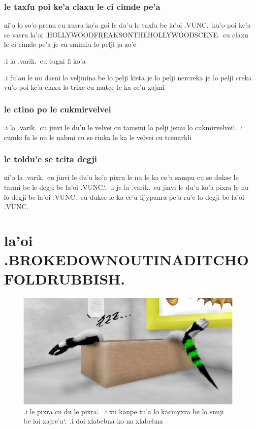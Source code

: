 \documentclass{report}
\newcommand\sds{\spacefactor\sfcode`.\ \space}
\begin{document}
\subsection{le taxfu poi ke'a claxu le ci cimde pe'a}
ni'o lo so'o prenu cu xusra ko'a goi le du'u le taxfu be la'oi .VUNC.\ ku'o poi ke'a se vasru la'oi .HOLLYWOODFREAKSONTHEHOLLYWOODSCENE.\ cu claxu le ci cimde pe'a je cu smimlu lo pelji ja zo'e

.i la .varik.\ cu tugni fi ko'a

.i fu'au le nu dasni lo veljmina be lo pelji kista je lo pelji nercreka je lo pelji creka vu'o poi ke'a claxu lo trixe cu mutce le ka ce'u xajmi

\subsection{le ctino po le cukmirvelvei}
.i la .varik.\ cu jinvi le du'u le velvei cu tamsmi lo pelji jenai lo cukmirvelvei\sds  .i cumki fa le nu le nabmi cu se rinka le ka le velvei cu tcenarkli

\subsection{le toldu'e se tcita degji}
ni'o la .varik.\ cu jinvi le du'u ko'a pixra le nu le ka ce'u sampu cu se dukse le tarmi be le degji be la'oi .VUNC.\sds  .i je la .varik.\ cu jinvi le du'u ko'a pixra le nu lo degji be la'oi .VUNC.\ cu dukse le ka ce'u lijypanra pe'a ru'e lo degji be la'oi .VUNC.

\chapter{la'oi .BROKEDOWNOUTINADITCHOFOLDRUBBISH.}
\begin{figure}[ht]
	\centering
	\includegraphics[width=\textwidth]{brokedownoutinaditchofoldrubbish/brokedownoutinaditchofoldrubbish.png}
	\caption[center]{.i le pixra cu du le pixra\sds  .i xu kanpe tu'a lo kacmyxra be lo snuji be loi xajre'u\sds  .i doi xlabebna ko na xlabebna}
\end{figure}
\end{document}
